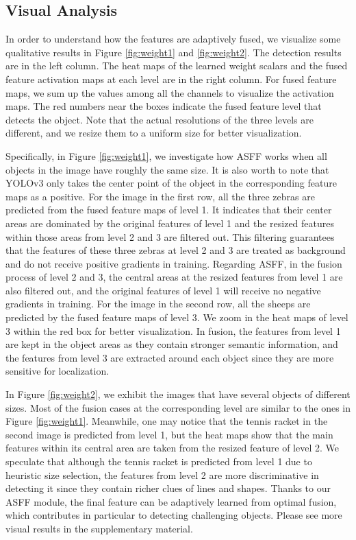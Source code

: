 \documentclass[10pt,twocolumn,letterpaper]{article}
\begin{document}
\subsection{Visual Analysis}

In order to understand how the features are adaptively fused, we visualize some qualitative results in Figure \ref{fig:weight1} and \ref{fig:weight2}. The detection results are in the left column. The heat maps of the learned weight scalars and the fused feature activation maps at each level are in the right column. For fused feature maps, we sum up the values among all the channels to visualize the activation maps. The red numbers near the boxes indicate the fused feature level that detects the object. Note that the actual resolutions of the three levels are different, and we resize them to a uniform size for better visualization.

Specifically, in Figure \ref{fig:weight1}, we investigate how ASFF works when all objects in the image have roughly the same size. It is also worth to note that YOLOv3 only takes the center point of the object in the corresponding feature maps as a positive. For the image in the first row, all the three zebras are predicted from the fused feature maps of level 1. It indicates that their center areas are dominated by the original features of level 1 and the resized features within those areas from level 2 and 3 are filtered out. This filtering guarantees that the features of these three zebras at level 2 and 3 are treated as background and do not receive positive gradients in training. Regarding ASFF, in the fusion process of level 2 and 3, the central areas at the resized features from level 1 are also filtered out, and the original features of level 1 will receive no negative gradients in training. For the image in the second row, all the sheeps are predicted by the fused feature maps of level 3. We zoom in the heat maps of level 3 within the red box for better visualization. In fusion, the features from level 1 are kept in the object areas as they contain stronger semantic information, and the features from level 3 are extracted around each object since they are more sensitive for localization.

In Figure \ref{fig:weight2}, we exhibit the images that have several objects of different sizes. Most of the fusion cases at the corresponding level are similar to the ones in Figure \ref{fig:weight1}. Meanwhile, one may notice that the tennis racket in the second image is predicted from level 1, but the heat maps show that the main features within its central area are taken from the resized feature of level 2. We speculate that although the tennis racket is predicted from level 1 due to heuristic size selection, the features from level 2 are more discriminative in detecting it since they contain richer clues of lines and shapes. Thanks to our ASFF module, the final feature can be adaptively learned from optimal fusion, which contributes in particular to detecting challenging objects. Please see more visual results in the supplementary material.
\end{document}
